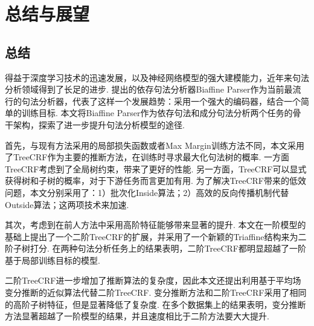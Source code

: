 \chapter{总结与展望}

\section{总结}
得益于深度学习技术的迅速发展，以及神经网络模型的强大建模能力，近年来句法分析领域得到了长足的进步.
\citet{dozat-etal-2017-biaffine}提出的依存句法分析器Biaffine Parser作为当前最流行的句法分析器，代表了这样一个发展趋势：采用一个强大的编码器，结合一个简单的训练目标.
本文将Biaffine Parser作为依存句法和成分句法分析两个任务的骨干架构，探索了进一步提升句法分析模型的途径.

首先，与现有方法采用的局部损失函数或者Max Margin训练方法不同，本文采用了TreeCRF作为主要的推断方法，在训练时寻求最大化句法树的概率.
一方面TreeCRF考虑到了全局树约束，带来了更好的性能.
另一方面，TreeCRF可以显式获得树和子树的概率，对于下游任务而言更加有用.
为了解决TreeCRF带来的低效问题，本文分别采用了：1）批次化Inside算法；2）高效的反向传播机制代替Outside算法；这两项技术来加速.

其次，考虑到在前人方法中采用高阶特征能够带来显著的提升.
本文在一阶模型的基础上提出了一个二阶TreeCRF的扩展，并采用了一个新颖的Triaffine结构来为二阶子树打分.
在两种句法分析任务上的结果表明，二阶TreeCRF都明显超越了一阶基于局部训练目标的模型.

二阶TreeCRF进一步增加了推断算法的复杂度，因此本文还提出利用基于平均场变分推断的近似算法代替二阶TreeCRF.
变分推断方法和二阶TreeCRF采用了相同的高阶子树特征，但是显著降低了复杂度.
在多个数据集上的结果表明，变分推断方法显著超越了一阶模型的结果，并且速度相比于二阶方法要大大提升.

